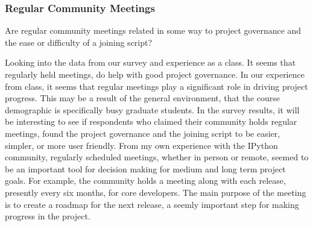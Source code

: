 \subsubsection{Regular Community Meetings}

{\italic Are regular community meetings related in some way to project governance and the ease or difficulty of a joining script?}

Looking into the data from our survey and experience as a class. It seems that regularly held meetings, do help with good project governance. In our experience from class, it seems that regular meetings play a significant role in driving project progress. This may be a result of the general environment, that the course demographic is specifically busy graduate students. In the survey results, it will be interesting to see if respondents who claimed their community holds regular meetings, found the project governance and the joining script to be easier, simpler, or more user friendly. From my own experience with the IPython community, regularly scheduled meetings, whether in person or remote, seemed to be an important tool for decision making for medium and long term project goals. For example, the community holds a meeting along with each release, presently every six months, for core developers. The main purpose of the meeting is to create a roadmap for the next release, a seemly important step for making progress in the project.
